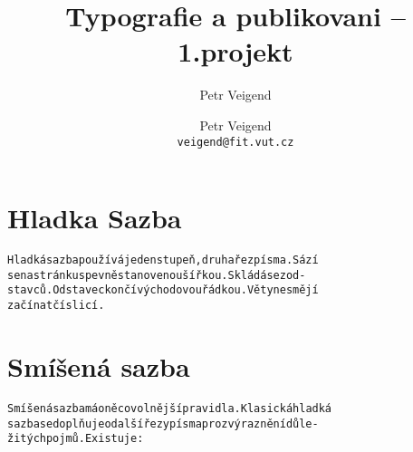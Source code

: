\documentclass[twocolumn, 10pt, a4paper]{article}
\title{Typografie a publikovani -- 1.projekt}
\author{Petr Veigend}
\author{Petr Veigend \\ \texttt{veigend@fit.vut.cz}}
\begin{document}
\maketitle
\section{Hladka Sazba}
\begin{alltt}
Hladká sazba používá jeden stupeň, druh a řez písma. Sází
se na stránku s pevně stanovenou šířkou. Skládá se z od-
stavců. Odstavec končí východovou řádkou. Věty nesmějí
začínat číslicí.
\end{alltt}
\section{Smíšená sazba}
\begin{alltt}
 Smíšená sazba má o něco volnější pravidla. Klasická hladká
sazba se doplňuje o další řezy písma pro zvýraznění důle-
žitých pojmů. Existuje :
\end{alltt}
\end{document}
